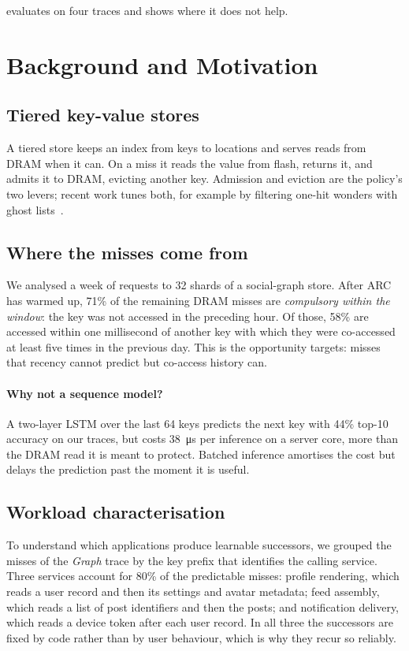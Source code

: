 \documentclass[10pt, twocolumn]{article}
\begin{document}
\noindent {} evaluates \sys{} on four traces and
shows where it does not help.

\section{Background and Motivation}
\label{sec:background}

\subsection{Tiered key-value stores}
A tiered store keeps an index from keys to locations and serves reads from
DRAM when it can. On a miss it reads the value from flash, returns it, and
admits it to DRAM, evicting another key. Admission and eviction are the
policy's two levers; recent work tunes both, for example by filtering
one-hit wonders with ghost lists~\cite{brandao2024ghost}.

\subsection{Where the misses come from}
We analysed a week of requests to 32 shards of a social-graph store. After
ARC has warmed up, 71\% of the remaining DRAM misses are \emph{compulsory
within the window}: the key was not accessed in the preceding hour. Of
those, 58\% are accessed within one millisecond of another key with which
they were co-accessed at least five times in the previous day. This is the
opportunity \sys{} targets: misses that recency cannot predict but
co-access history can.

\paragraph{Why not a sequence model?}
A two-layer LSTM over the last 64 keys predicts the next key with 44\%
top-10 accuracy on our traces, but costs \SI{38}{\micro\second} per
inference on a server core, more than the DRAM read it is meant to protect.
Batched inference amortises the cost but delays the prediction past the
moment it is useful.

\subsection{Workload characterisation}
To understand which applications produce learnable successors, we grouped
the misses of the \emph{Graph} trace by the key prefix that identifies the
calling service. Three services account for 80\% of the predictable misses:
profile rendering, which reads a user record and then its settings and
avatar metadata; feed assembly, which reads a list of post identifiers and
then the posts; and notification delivery, which reads a device token after
each user record. In all three the successors are fixed by code rather
than by user behaviour, which is why they recur so reliably.
\end{document}
